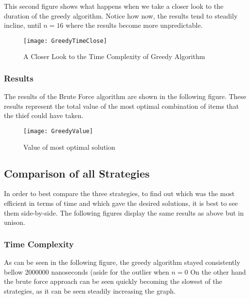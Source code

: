 \documentclass[12pt]{article}
\begin{document}
    This second figure shows what happens when we take a closer look to the duration of the greedy algorithm. Notice how now, the results tend to steadily incline, until $n = 16$ where the results become more unpredictable. 
    
     \begin{figure}[H]
		\begin{center}    
    		\texttt{[image: GreedyTimeClose]}
            \caption{A Closer Look to the Time Complexity of Greedy Algorithm}
    	\end{center}
    \end{figure}
    
    \subsubsection*{Results}
    
    The results of the Brute Force algorithm are shown in the following figure. These results represent the total value of the most optimal combination of items that the thief could have taken.
    
    
   \begin{figure}[H]
		\begin{center}    
    		\texttt{[image: GreedyValue]}            
            \caption{Value of most optimal solution}
    	\end{center}
    \end{figure}
    
    
    \subsection*{Comparison of all Strategies}
    
    In order to best compare the three strategies, to find out which was the most efficient in terms of time and which gave the desired solutions, it is best to see them side-by-side. The following figures display the same results as above but in unison.
    
    \subsubsection*{Time Complexity}  
    
    As can be seen in the following figure, the greedy algorithm stayed consistently bellow 2000000 nanoseconds (aside for the outlier when $n = 0 $ On the other hand the brute force approach can be seen quickly becoming the slowest of the strategies, as it can be seen steadily increasing the graph.
    
\end{document}
